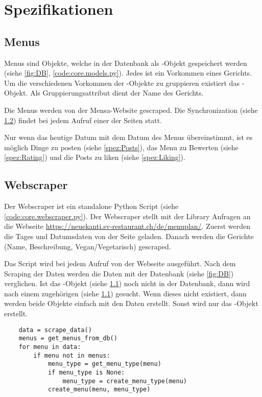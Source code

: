 \chapter{Spezifikationen}

\section{Menus} \label{spez:Menus}

Menus sind Objekte, welche in der Datenbank als -Objekt gespeichert
werden (siehe \ref{fig:DB}, \ref{code:core.models.py}). Jedes  ist
ein Vorkommen eines Gerichts. Um die verschiedenen Vorkommen der
-Objekte zu gruppieren existiert das -Objekt. Als
Gruppierungsattribut dient der Name des Gerichts.

Die Menus werden von der Mensa-Website gescraped. Die Synchronization (siehe
\ref{spez:Webscraper}) findet bei jedem Aufruf einer der Seiten statt.

Nur wenn das heutige Datum mit dem Datum des Menus übereinstimmt, ist es möglich
Dinge zu posten (siehe \ref{spez:Posts}), das Menu zu Bewerten (siehe
\ref{spez:Rating}) und die Posts zu liken (siehe \ref{spez:Liking}).

\section{Webscraper} \label{spez:Webscraper}

Der Webscraper ist ein standalone Python Script (siehe
\ref{code:core.webscraper.py}). Der Webscraper stellt mit der Library
 Anfragen an die Webseite
\url{https://neuekanti.sv-restaurant.ch/de/menuplan/}. Zuerst werden die Tages
und Datumsdaten von der Seite geladen. Danach werden die Gerichte (Name,
Beschreibung, Vegan/Vegetarisch) gescraped.

Das Script wird bei jedem Aufruf von der Webseite ausgeführt. Nach dem Scraping
der Daten werden die Daten mit der Datenbank (siehe \ref{fig:DB}) verglichen.
Ist das -Objekt (siehe \ref{spez:Menus}) noch nicht in der Datenbank,
dann wird nach einem zugehörigen  (siehe \ref{spez:Menus})
gesucht. Wenn dieses nicht existiert, dann werden beide Objekte einfach mit den
Daten erstellt. Sonst wird nur das -Objekt erstellt.

\begin{lstlisting}
    data = scrape_data()
    menus = get_menus_from_db()
    for menu in data:
        if menu not in menus:
            menu_type = get_menu_type(menu)
            if menu_type is None:
                menu_type = create_menu_type(menu)
            create_menu(menu, menu_type)
\end{lstlisting}


